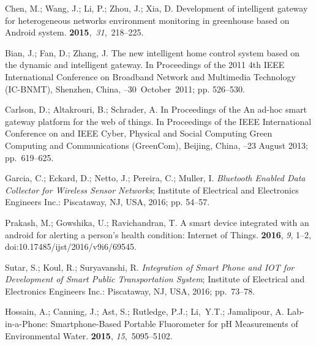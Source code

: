 \documentclass[symmetry,article,accept,moreauthors,pdftex10pt,a4paper]{mdpi}
\begin{document}
\begin{thebibliography}{999}
Chen, M.; Wang, J.; Li, P.; Zhou, J.; Xia, D.
\newblock Development of intelligent gateway for heterogeneous networks
environment monitoring in greenhouse based on Android system.
 {\bf 2015},~{\em 31},~218--225.

Bian, J.; Fan, D.; Zhang, J.
\newblock The new intelligent home control system based on the dynamic and
intelligent gateway. In Proceedings of the 2011 4th IEEE International Conference on  Broadband Network and Multimedia Technology (IC-BNMT), Shenzhen, China,
--30~October~2011; pp. 526--530.

Carlson, D.; Altakrouri, B.; Schrader, A.
\newblock In Proceedings of the An ad-hoc smart gateway platform for the web of things. In Proceedings of the IEEE International Conference on and IEEE Cyber, Physical and Social Computing  Green Computing and Communications (GreenCom),  Beijing, China,
--23 August 2013; pp.~619--625.

Garcia, C.; Eckard, D.; Netto, J.; Pereira, C.; Muller, I.
\newblock \emph{Bluetooth Enabled Data Collector for Wireless Sensor Networks};
\newblock Institute of Electrical and Electronics Engineers Inc.: Piscataway, NJ, USA, 2016; pp.
54--57.

Prakash, M.; Gowshika, U.; Ravichandran, T.
\newblock A smart device integrated with an android for alerting a person's
health condition: Internet of Things.
 {\bf 2016}, {\em 9}, 1--2, doi:10.17485/ijst/2016/v9i6/69545.

Sutar, S.; Koul, R.; Suryavanshi, R.
\newblock \emph{Integration of Smart Phone and IOT for Development of Smart Public
	Transportation System};
\newblock Institute of Electrical and Electronics Engineers Inc.: Piscataway, NJ, USA, 2016; pp.~73--78.

Hossain, A.; Canning, J.; Ast, S.; Rutledge, P.J.; Li,~Y.T.; Jamalipour, A.
\newblock Lab-in-a-Phone: Smartphone-Based Portable Fluorometer for pH
Measurements of Environmental Water.
 {\bf 2015}, {\em 15},~5095--5102.


\end{thebibliography}
\end{document}
